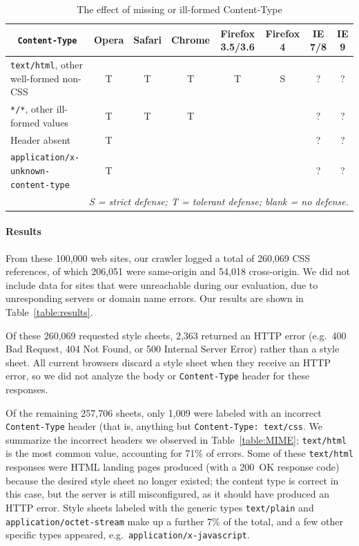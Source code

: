 \documentclass{acm_proc_article-sp}
\begin{document}
\begin{table}
\centering
\begin{tabular}{lccccccc}
\toprule
\multicolumn{1}{c}{\texttt{Content-Type}}
&Opera&Safari&Chrome&Firefox 3.5/3.6&Firefox 4&IE 7/8&IE 9\\
\midrule
\texttt{text/html},
other well-formed non-CSS                   & T & T & T & T & S & ? & ?\\
\texttt{*/*}, other ill-formed values       & T & T & T &   &   & ? & ?\\
Header absent                               & T &   &   &   &   & ? & ?\\
\texttt{application/x-unknown-content-type} & T &   &   &   &   & ? & ?\\
\bottomrule
\multicolumn{8}{r}{\vrule height10pt width0pt\relax\itshape
  S = strict defense; T = tolerant defense; blank = no defense.}
\end{tabular}
\caption{The effect of missing or ill-formed
  Content-Type}\label{table:adoption}
\end{table}

\paragraph{Results}
From these 100,000 web sites, our crawler logged a total of 260,069
CSS references, of which 206,051 were same-origin and 54,018
cross-origin.  We did not include data for sites that were unreachable
during our evaluation, due to unresponding servers or domain name
errors. Our results are shown in Table~\ref{table:results}.

Of these 260,069 requested style sheets, 2,363 returned an HTTP error
(e.g.\ 400 Bad Request, 404 Not Found, or 500 Internal Server Error)
rather than a style sheet.  All current browsers discard a style sheet
when they receive an HTTP error, so we did not analyze the body or
\texttt{Content-Type} header for these responses.

Of the remaining 257,706 sheets, only 1,009 were labeled with an
incorrect \texttt{Content-Type} header (that is, anything but
\verb|Content-Type: text/css|.  We summarize the incorrect headers we
observed in Table~\ref{table:MIME}; \verb|text/html| is the most
common value, accounting for 71\% of errors.  Some of these
\verb|text/html| responses were HTML landing pages produced (with a
200~OK response code) because the desired style sheet no longer
existed; the content type is correct in this case, but the
server is still misconfigured, as it should have produced an HTTP
error.  Style sheets labeled with the generic types \verb|text/plain|
and \verb|application/octet-stream| make up a further 7\% of the
total, and a few other specific types appeared,
e.g.~\verb|application/x-javascript|.
\end{document}
